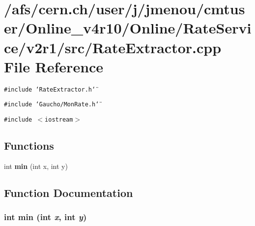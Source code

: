 \section{/afs/cern.ch/user/j/jmenou/cmtuser/Online\_\-v4r10/Online/Rate\-Service/v2r1/src/Rate\-Extractor.cpp File Reference}
\label{RateExtractor_8cpp}
{\tt \#include \char`\"{}Rate\-Extractor.h\char`\"{}}\par
{\tt \#include \char`\"{}Gaucho/Mon\-Rate.h\char`\"{}}\par
{\tt \#include $<$iostream$>$}\par
\subsection*{Functions}
\begin{CompactItemize}
\item 
int {\bf min} (int x, int y)
\end{CompactItemize}


\subsection{Function Documentation}
\subsubsection{\setlength{\rightskip}{0pt plus 5cm}int min (int {\em x}, int {\em y})}\label{RateExtractor_8cpp_a0}


